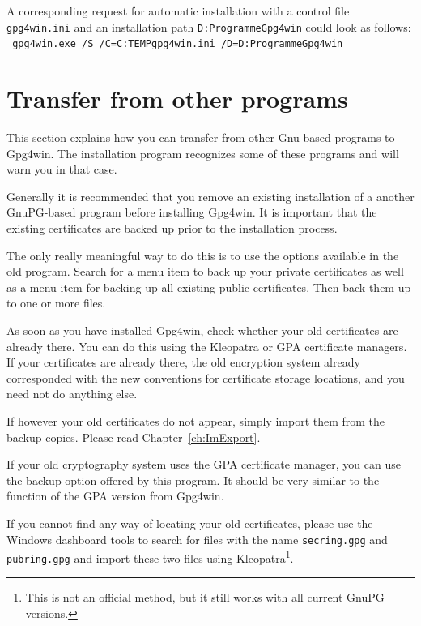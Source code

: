 \documentclass[a4paper,11pt,oneside,openright,titlepage]{scrbook}
\newcommand{\Filename}[1]{\small{\texttt{#1}}\normalsize}
\begin{document}
A corresponding request for automatic installation with a control file
\Filename{gpg4win.ini} and an installation path
\Filename{D:\back{}Programme\back{}Gpg4win} could look as follows:\\
\Filename{
  gpg4win.exe /S /C=C:\back{}TEMP\back{}gpg4win.ini  /D=D:\back{}Programme\back{}Gpg4win
  \ifthenelse{\boolean{DIN-A5}}{\normalsize}{}
}

\clearpage
\chapter{Transfer from other programs}

\label{ch:migration}

This section explains how you can transfer from other Gnu-based
programs to Gpg4win. The installation program recognizes some of these
programs and will warn you in that case.

Generally it is recommended that you remove an existing installation
of a another GnuPG-based program before installing Gpg4win. It is
important that the existing certificates are backed up prior to the
installation process.

The only really meaningful way to do this is to use the options
available in the old program. Search for a menu item to back up your
private certificates as well as a menu item for backing up all
existing public certificates. Then back them up to one or more files.

As soon as you have installed Gpg4win, check whether your old
certificates are already there. You can do this using the Kleopatra or
GPA certificate managers. If your certificates are already there, the
old encryption system already corresponded with the new conventions
for certificate storage locations, and you need not do anything else.

If however your old certificates do not appear, simply import them
from the backup copies. Please read Chapter~\ref{ch:ImExport}.

If your old cryptography system uses the GPA certificate manager, you
can use the backup option offered by this program. It should be very
similar to the function of the GPA version from Gpg4win.

If you cannot find any way of locating your old certificates, please
use the Windows dashboard tools to search for files with the name
\Filename{secring.gpg} and  \Filename{pubring.gpg} and import these
two files using Kleopatra\footnote{This is not an official method, but
it still works with all current GnuPG versions.}.
\end{document}
